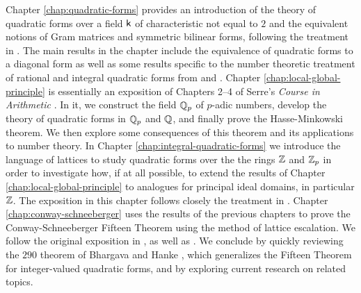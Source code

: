 Chapter \ref{chap:quadratic-forms} provides an introduction of the theory of quadratic forms over a field \(\mathsf{k}\) of characteristic not equal to \(2\) and the equivalent notions of Gram matrices and symmetric bilinear forms, following the treatment in \cite{lam1973quadratic}. The main results in the chapter include the equivalence of quadratic forms to a diagonal form as well as some results specific to the number theoretic treatment of rational and integral quadratic forms from \cite{cassels2008rational} and \cite{jones1950arithmetic}. Chapter \ref{chap:local-global-principle} is essentially an exposition of Chapters 2--4 of Serre's \emph{Course in Arithmetic} \cite{serre2012course}. In it, we construct the field \(\mathbb{Q}_p\) of \(p\)-adic numbers, develop the theory of quadratic forms in \(\mathbb{Q}_p\) and \(\mathbb{Q}\), and finally prove the Hasse-Minkowski theorem. We then explore some consequences of this theorem and its applications to number theory. In Chapter \ref{chap:integral-quadratic-forms} we introduce the language of lattices to study quadratic forms over the the rings \(\mathbb{Z}\) and \(\mathbb{Z}_p\) in order to investigate how, if at all possible, to extend the results of Chapter \ref{chap:local-global-principle} to analogues for principal ideal domains, in particular \(\mathbb{Z}\). The exposition in this chapter follows closely the treatment in \cite{cassels2008rational,gerstein2008basic,jones1950arithmetic}. Chapter \ref{chap:conway-schneeberger} uses the results of the previous chapters to prove the Conway-Schneeberger Fifteen Theorem using the method of lattice escalation. We follow the original exposition in \cite{bhargava2000conway}, as well as \cite{moon2008universal}. We conclude by quickly reviewing the \(290\) theorem of Bhargava and Hanke \cite{bhargava2005universal}, which generalizes the Fifteen Theorem for integer-valued quadratic forms, and by exploring current research on related topics.